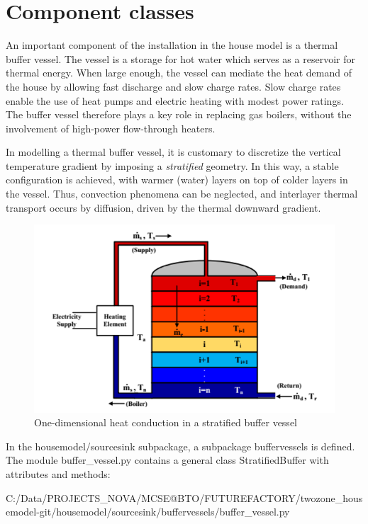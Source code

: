 \section{Component classes}

An important component of the installation in the house model is a thermal buffer vessel. The vessel is a storage for hot water which serves as a reservoir for thermal energy. When large enough, the vessel can mediate the heat demand of the house by allowing fast discharge and slow charge rates. Slow charge rates enable the use of heat pumps and electric heating with modest power ratings. The buffer vessel therefore plays a key role in replacing gas boilers, without the involvement of high-power flow-through heaters. 

In modelling a thermal buffer vessel, it is customary to discretize the vertical temperature gradient by imposing a \emph{stratified} geometry. In this way, a stable configuration is achieved, with warmer (water) layers on top of colder layers in the vessel. Thus, convection phenomena can be neglected, and interlayer thermal transport occurs by diffusion, driven by the thermal downward gradient.

\begin{figure}[H]
	\centering
	\includegraphics[width=0.5\columnwidth]{Pictures/stratified.png}
	\caption[Short title]{One-dimensional heat conduction in a stratified buffer vessel}
	\label{fig:stratified}
\end{figure} 

In the \textsf{housemodel/sourcesink} subpackage, a subpackage \textsf{buffervessels} is defined. The module buffer\_vessel.py contains a general class \textsf{StratifiedBuffer} with attributes and methods:

 
{C:/Data/PROJECTS_NOVA/MCSE@BTO/FUTUREFACTORY/twozone_housemodel-git/housemodel/sourcesink/buffervessels/buffer_vessel.py}






















\newpage